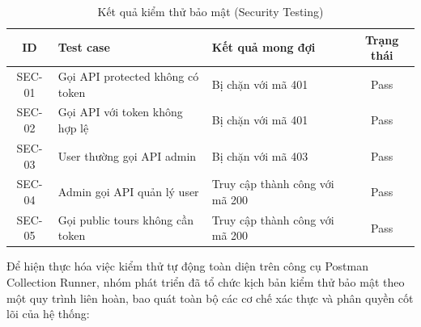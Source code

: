\begin{table}[H]
\centering
\small
\caption{Kết quả kiểm thử bảo mật (Security Testing)}
\label{tab:test_sec}
\begin{tabularx}{\textwidth}{|c|p{4.2cm}|X|c|}
\hline
\textbf{ID} & \textbf{Test case} & \textbf{Kết quả mong đợi} & \textbf{Trạng thái} \\
\hline
SEC-01 & Gọi API protected không có token & Bị chặn với mã 401 & Pass \\
\hline
SEC-02 & Gọi API với token không hợp lệ & Bị chặn với mã 401 & Pass \\
\hline
SEC-03 & User thường gọi API admin & Bị chặn với mã 403 & Pass \\
\hline
SEC-04 & Admin gọi API quản lý user & Truy cập thành công với mã 200 & Pass \\
\hline
SEC-05 & Gọi public tours không cần token & Truy cập thành công với mã 200 & Pass \\
\hline
\end{tabularx}
\end{table}

Để hiện thực hóa việc kiểm thử tự động toàn diện trên công cụ Postman Collection Runner, nhóm phát triển đã tổ chức kịch bản kiểm thử bảo mật theo một quy trình liên hoàn, bao quát toàn bộ các cơ chế xác thực và phân quyền cốt lõi của hệ thống:

